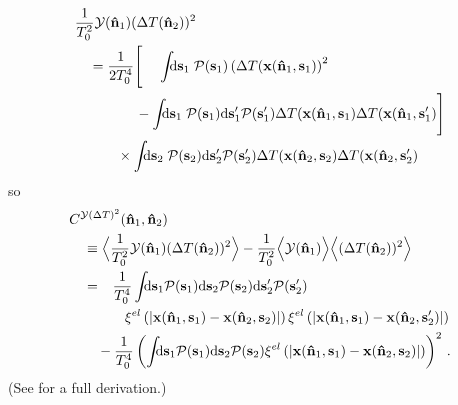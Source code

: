 \documentclass[fleqn,usenatbib]{mnras}
\begin{document}
    \begin{align}
        & \frac{1}{T_0^2}\Yd(\nhat_1)(\DeltaT(\nhat_2))^2
            \\
            &\quad =
             \frac{1}{2T_0^4}
                \Bigg[
                    \ \phantom{+} \int\!\!\!\dif{\mbf{s}_1}\;
                        \mcal{P}(\mbf{s}_1) 
                        \left(\DeltaT(\mbf{x}(\nhat_1,\mbf{s}_1)\right)^2
                 \nonumber\\ &\qquad\qquad\
                    - \int\!\!\!\dif{\mbf{s}_1}\; \mcal{P}(\mbf{s}_1) \dif{\mbf{s}'_1} \mcal{P}(\mbf{s}'_1)
                        \DeltaT(\mbf{x}(\nhat_1,\mbf{s}_1)
                        \DeltaT(\mbf{x}(\nhat_1,\mbf{s}'_1)
                \Bigg] \nonumber
                \\ &\qquad\quad
                \times \int\!\!\!\dif{\mbf{s}_2} \; \mcal{P}(\mbf{s}_2) \dif{\mbf{s}'_2} \mcal{P}(\mbf{s}'_2)
                    \DeltaT(\mbf{x}(\nhat_2,\mbf{s}_2)
                    \DeltaT(\mbf{x}(\nhat_2,\mbf{s}'_2) \nonumber
    \end{align}
    so
    \begin{align}
    & C^{\Yd(\DeltaT)^2}(\mbf{\nhat}_1,\mbf{\nhat}_2) \nonumber
        \\
        &\quad \equiv
            \Big\langle \frac{1}{T_0^2}\Yd(\nhat_1)(\DeltaT(\nhat_2))^2 \Big\rangle
            - \frac{1}{T_0^2} \Big\langle\Yd(\nhat_1)\Big\rangle \Big\langle(\DeltaT(\nhat_2))^2 \Big\rangle 
        \\
        &\quad =
            \phantom{+} \frac{1}{T_0^4}
            \int\!\!\!\dif{\mbf{s}_1} \mcal{P}(\mbf{s}_1) \dif{\mbf{s}_2} \mcal{P}(\mbf{s}_2) \dif{\mbf{s}'_2} \mcal{P}(\mbf{s}'_2)
            \\ &\qquad\qquad
            \xi^{el}\left(\norm{ \mbf{x}(\nhat_1,\mbf{s}_1) - \mbf{x}(\nhat_2,\mbf{s}_2) }\right)
            \xi^{el}\left(\norm{ \mbf{x}(\nhat_1,\mbf{s}_1) - \mbf{x}(\nhat_2,\mbf{s}'_2) }\right) \nonumber
            \\ &\qquad
            - \frac{1}{T_0^4}
              \left(
                \int\!\!\! \dif{\mbf{s}_1} \mcal{P}(\mbf{s}_1) \dif{\mbf{s}_2} \mcal{P}(\mbf{s}_2)
                    \xi^{el}\left(\norm{ \mbf{x}(\nhat_1,\mbf{s}_1) - \mbf{x}(\nhat_2,\mbf{s}_2) }\right)
              \right)^2 \,. \nonumber
    \end{align}
    (See  for a full derivation.)
\end{document}
